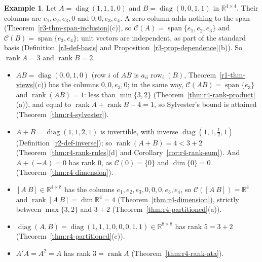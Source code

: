 \documentclass[12pt]{article}
\newcommand{\R}{\mathbb R}
\DeclareMathOperator{\row}{row}
\DeclareMathOperator{\diag}{diag}
\DeclareMathOperator{\rank}{rank}
\DeclareMathOperator{\Span}{span}
\theoremstyle{definition}
\newtheorem{example}[theorem]{Example}
\begin{document}
\begin{example}\label{exm:r4-bounds}
Let \(A=\diag(1,1,1,0)\) and \(B=\diag(0,0,1,1)\) in \(\R^{4\times4}\). Their columns are
\(e_1,e_2,e_3,0\) and \(0,0,e_3,e_4\). A zero column adds nothing to the span
(Theorem~\ref{r3-thm-span-inclusion}(c)), so \(\mathcal C(A)=\Span\{e_1,e_2,e_3\}\) and
\(\mathcal C(B)=\Span\{e_3,e_4\}\); unit vectors are independent, as part of the standard basis
(Definition~\ref{r3-def-basis} and Proposition~\ref{r3-prop-dependence}(b)). So \(\rank A=3\) and \(\rank B=2\).
\begin{itemize}
\item \(AB=\diag(0,0,1,0)\) (row \(i\) of \(AB\) is \(a_{ii}\row_i(B)\), Theorem~\ref{r1-thm-views}(c)) has the
columns \(0,0,e_3,0\); in the same way, \(\mathcal C(AB)=\Span\{e_3\}\) and \(\rank(AB)=1\): less than
\(\min\{3,2\}\) (Theorem~\ref{thm:r4-rank-product}(a)), and equal to \(\rank A+\rank B-4=1\), so Sylvester's bound
is attained (Theorem~\ref{thm:r4-sylvester}).
\item \(A+B=\diag(1,1,2,1)\) is invertible, with inverse \(\diag(1,1,\frac12,1)\) (Definition~\ref{r2-def-inverse}); so
\(\rank(A+B)=4<3+2\) (Theorem~\ref{thm:r4-rank-rules}(d) and Corollary~\ref{cor:r4-rank-sum}). And \(A+(-A)=0\) has
rank \(0\), as \(\mathcal C(0)=\{0\}\) and \(\dim\{0\}=0\) (Theorem~\ref{thm:r4-dimension}).
\item \([A\ B]\in\R^{4\times8}\) has the columns \(e_1,e_2,e_3,0,0,0,e_3,e_4\), so
\(\mathcal C([A\ B])=\R^4\) and \(\rank[A\ B]=\dim\R^4=4\) (Theorem~\ref{thm:r4-dimension}), strictly between
\(\max\{3,2\}\) and \(3+2\) (Theorem~\ref{thm:r4-partitioned}(a)).
\item \(\diag(A,B)=\diag(1,1,1,0,0,0,1,1)\in\R^{8\times8}\) has rank \(5=3+2\)
(Theorem~\ref{thm:r4-partitioned}(c)).
\item \(A'A=A^2=A\) has rank \(3=\rank A\) (Theorem~\ref{thm:r4-rank-ata}).
\end{itemize}
\end{example}
\end{document}
